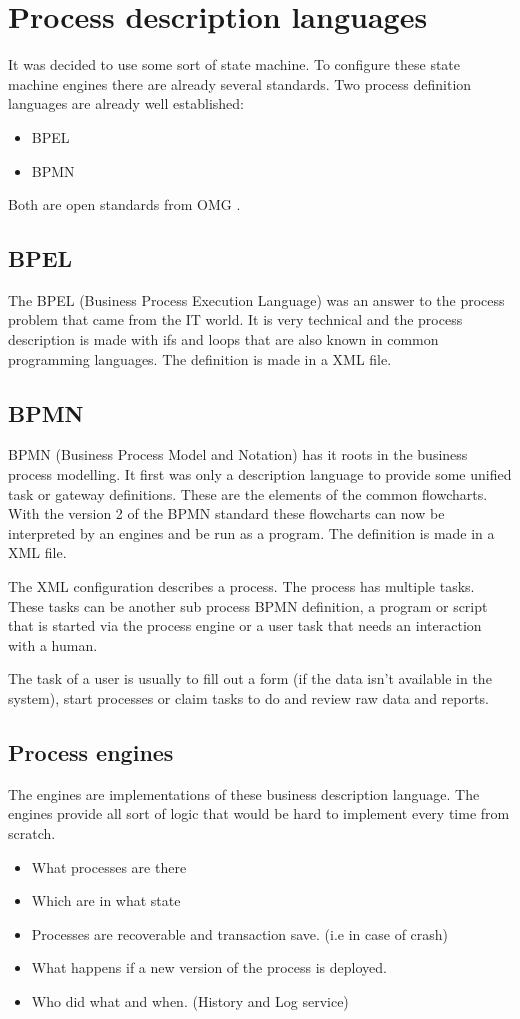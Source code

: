 \documentclass[paper=a4,twoside=false,BCOR=0mm,DIV=calc,fontsize=12pt]{scrartcl}
\begin{document}
\section{Process description languages}
It was decided to use some sort of state machine. To configure these state machine engines there are already several standards. 
Two process definition languages are already well established:

\begin{itemize}
 \item BPEL
 \item BPMN
\end{itemize}

Both are open standards from OMG \cite{omg}.

\subsection{BPEL}
The BPEL (Business Process Execution Language) \cite{bpel} was an answer to the process problem that came from the IT world. It is very technical and the process description is made with ifs and loops that are also known in common programming languages. The definition is made in a XML file. 

\subsection{BPMN}
BPMN (Business Process Model and Notation) \cite{bpmn} has it roots in the business process modelling. It first was only a description language to provide some unified task or gateway definitions. These are the elements of the common flowcharts. 
With the version 2 of the BPMN standard these flowcharts can now be interpreted by an engines and be run as a program.
The definition is made in a XML file. 

The XML configuration describes a process. The process has multiple tasks. These tasks can be another sub process BPMN definition, a program or script that is started via the process engine or a user task that needs an interaction with a human. 

The task of a user is usually to fill out a form (if the data isn't available in the system), start processes or claim tasks to do and review raw data and reports.

\subsection{Process engines}
The engines are implementations of these business description language. The engines provide all sort of logic that would be hard to implement every time from scratch.
\begin{itemize}
  \item What processes are there
  \item Which are in what state
  \item Processes are recoverable and transaction save. (i.e in case of crash)
  \item What happens if a new version of the process is deployed.
  \item Who did what and when. (History and Log service)
\end{itemize}
\end{document}
